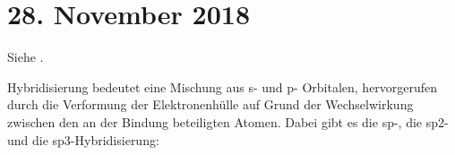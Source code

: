 \section{28. November 2018}
\label{q:61}

Siehe .


\label{q:62}

Hybridisierung bedeutet eine Mischung aus s- und p- Orbitalen,
hervorgerufen durch die Verformung der Elektronenhülle auf Grund
der Wechselwirkung zwischen den an der Bindung beteiligten Atomen.
Dabei gibt es die sp-, die sp2- und die sp3-Hybridisierung:

